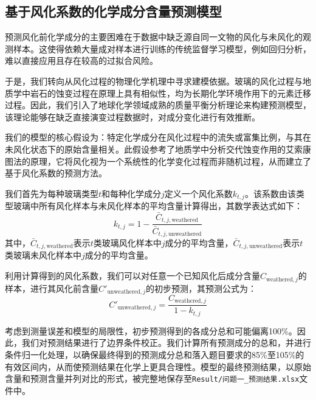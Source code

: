 \subsection{基于风化系数的化学成分含量预测模型}

预测风化前化学成分的主要困难在于数据中缺乏源自同一文物的风化与未风化的观测样本。这使得依赖大量成对样本进行训练的传统监督学习模型，例如回归分析，难以直接应用且存在较高的过拟合风险。

于是，我们转向从风化过程的物理化学机理中寻求建模依据。玻璃的风化过程与地质学中岩石的蚀变过程在原理上具有相似性，均为长期化学环境作用下的元素迁移过程。因此，我们引入了地球化学领域成熟的质量平衡分析理论来构建预测模型，该理论能够在缺乏直接演变过程数据时，对成分变化进行有效推断。

我们的模型的核心假设为：特定化学成分在风化过程中的流失或富集比例，与其在未风化状态下的原始含量相关。此假设参考了地质学中分析交代蚀变作用的艾索康图法的原理，它将风化视为一个系统性的化学变化过程而非随机过程，从而建立了基于风化系数的预测方法。

我们首先为每种玻璃类型$t$和每种化学成分$j$定义一个风化系数$k_{t,j}$。该系数由该类型玻璃中所有风化样本与未风化样本的平均含量计算得出，其数学表达式如下：
\begin{equation}
	k_{t,j} = 1 - \frac{\bar{C}_{t,j,\text{weathered}}}{\bar{C}_{t,j,\text{unweathered}}}
\end{equation}
其中，$\bar{C}_{t,j,\text{weathered}}$表示$t$类玻璃风化样本中$j$成分的平均含量，$\bar{C}_{t,j,\text{unweathered}}$表示$t$类玻璃未风化样本中$j$成分的平均含量。

利用计算得到的风化系数，我们可以对任意一个已知风化后成分含量$C_{\text{weathered}, j}$的样本，进行其风化前含量$C'_{\text{unweathered}, j}$的初步预测，其预测公式为：
\begin{equation}
	C'_{\text{unweathered}, j} = \frac{C_{\text{weathered}, j}}{1 - k_{t,j}}
\end{equation}

考虑到测量误差和模型的局限性，初步预测得到的各成分总和可能偏离100\%。因此，我们对预测结果进行了边界条件校正。我们计算所有预测成分的总和，并进行条件归一化处理，以确保最终得到的预测成分总和落入题目要求的85\%至105\%的有效区间内，从而使预测结果在化学上更具合理性。模型的最终预测结果，以原始含量和预测含量并列对比的形式，被完整地保存至\texttt{Result/问题一\_预测结果.xlsx}文件中。

